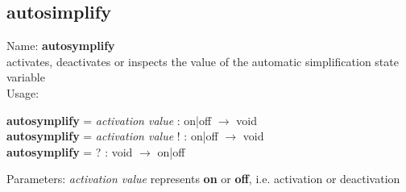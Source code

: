 \subsection{ autosimplify }
\noindent Name: \textbf{autosymplify}\\
activates, deactivates or inspects the value of the automatic simplification state variable\\

\noindent Usage: 
\begin{center}
\textbf{autosymplify} = \emph{activation value} : \textsf{on|off} $\rightarrow$ \textsf{void}\\
\textbf{autosymplify} = \emph{activation value} ! : \textsf{on|off} $\rightarrow$ \textsf{void}\\
\textbf{autosymplify} = ? : \textsf{void} $\rightarrow$ \textsf{on|off}\\
\end{center}
Parameters: 
\emph{activation value} represents \textbf{on} or \textbf{off}, i.e. activation or deactivation\\

